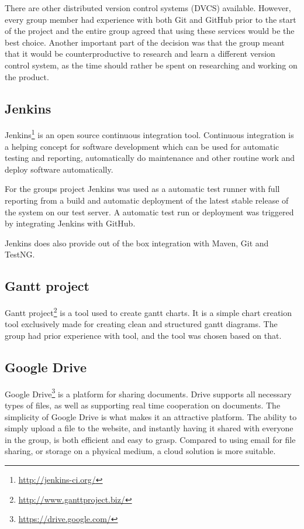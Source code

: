 There are other distributed version control systems (DVCS) available. However, every group member had experience with both Git and GitHub prior to the start of the project and the entire group agreed that using these services would be the best choice. Another important part of the decision was that the group meant that it would be counterproductive to research and learn a different version control system, as the time should rather be spent on researching and working on the product.

\subsection{Jenkins}
Jenkins\footnote{\url{http://jenkins-ci.org/}} is an open source continuous integration tool. Continuous integration is a helping concept for software development which can be used for automatic testing and reporting, automatically do maintenance and other routine work and deploy software automatically. 

For the groups project Jenkins was used as a automatic test runner with full reporting from a build and automatic deployment of the latest stable release of the system on our test server. A automatic test run or deployment was triggered by integrating Jenkins with GitHub.

Jenkins does also provide out of the box integration with Maven, Git and TestNG.

\subsection{Gantt project}

Gantt project\footnote{\url{http://www.ganttproject.biz/}} is a tool used to create gantt charts. It is a simple chart creation tool exclusively made for creating clean and structured gantt diagrams. The group had prior experience with tool, and the tool was chosen based on that.

\subsection{Google Drive}

Google Drive\footnote{\url{https://drive.google.com/}} is a platform for sharing documents. Drive supports all necessary types of files, as well as supporting real time cooperation on documents. The simplicity of Google Drive is what makes it an attractive platform. The ability to simply upload a file to the website, and instantly having it shared with everyone in the group, is both efficient and easy to grasp. Compared to using email for file sharing, or storage on a physical medium, a cloud solution is more suitable. 

